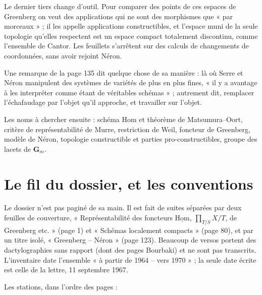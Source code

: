 \documentclass[11pt,a4paper]{article}
\begin{document}
\begin{resume}
Le dernier tiers change d'outil. Pour comparer des points de ces espaces de
Greenberg on veut des applications qui ne sont des morphismes que « par
morceaux » ; il les appelle applications constructibles, et l'espace muni de
la seule topologie qu'elles respectent est un espace compact totalement
discontinu, comme l'ensemble de Cantor. Les feuillets s'arrêtent sur des
calculs de changements de coordonnées, sans avoir rejoint Néron.

Une remarque de la page 135 dit quelque chose de sa manière : là où Serre et
Néron manipulent des systèmes de variétés de plus en plus fines, « il y a
avantage à les interpréter comme étant de véritables schémas » ; autrement dit,
remplacer l'échafaudage par l'objet qu'il approche, et travailler sur l'objet.

Les noms à chercher ensuite : schéma $\mathrm{Hom}$ et théorème de
Matsumura--Oort, critère de représentabilité de Murre, restriction de Weil,
foncteur de Greenberg, modèle de Néron, topologie constructible et parties
pro-constructibles, groupe des lacets de $\mathbf{G}_m$.

\end{resume}

\section*{Le fil du dossier, et les conventions}

Le dossier n'est pas paginé de sa main. Il est fait de suites séparées par
deux feuilles de couverture, « Représentabilité des foncteurs
$\underline{\mathrm{Hom}}$, $\prod_{T/S} X/T$, de Greenberg etc. » (page 1) et
« Schémas localement compacts » (page 80), et par un titre isolé,
« Greenberg -- Néron » (page 123). Beaucoup de versos portent des
dactylographies sans rapport (dont des pages Bourbaki) et ne sont pas
transcrits. L'inventaire date l'ensemble « à partir de 1964 -- vers 1970 » ;
la seule date écrite est celle de la lettre, 11 septembre 1967.

Les stations, dans l'ordre des pages :
\end{document}
